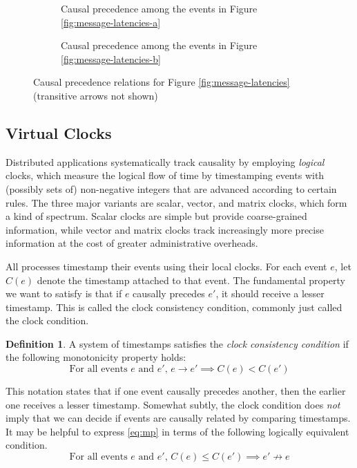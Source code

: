 \documentclass[]             %
{NASA}                       %
\theoremstyle{definition}
\newtheorem{definition}[theorem]{Definition}
\begin{document}
\begin{figure}
  \begingroup
  \setlength\belowcaptionskip{4ex}
  \begin{subfigure}{1\textwidth}
    \centering
    
    \caption{Causal precedence among the events in Figure \ref{fig:message-latencies-a}}
    \label{fig:message-co-a}
  \end{subfigure}
  \endgroup
  \begin{subfigure}{1\textwidth}
    \centering
    
    \caption{Causal precedence among the events in Figure \ref{fig:message-latencies-b}}
    \label{fig:message-co-b}
  \end{subfigure}
  \caption{Causal precedence relations for Figure \ref{fig:message-latencies} (transitive arrows not shown)}
  \label{fig:causal-precedence}
\end{figure}

\subsection{Virtual Clocks}
\label{ssec:timestamps}
Distributed applications systematically track causality by employing
\emph{logical} clocks, which measure the logical flow of time by
timestamping events with (possibly sets of) non-negative integers that
are advanced according to certain rules. The three major variants are
scalar, vector, and matrix clocks, which form a kind of
spectrum. Scalar clocks are simple but provide coarse-grained
information, while vector and matrix clocks track increasingly more
precise information at the cost of greater administrative overheads.

All processes timestamp their events using their local clocks. For
each event $e$, let $C(e)$ denote the timestamp attached to that
event. The fundamental property we want to satisfy is that if $e$
causally precedes $e'$, it should receive a lesser timestamp. This is
called the clock consistency condition, commonly just called the clock condition.

\begin{definition}
  A system of timestamps satisfies the \emph{clock consistency
  condition} if the following monotonicity property holds:
  \[ \textrm{For all events $e$ and $e'$, } e \to e' \implies C(e) < C(e') \label{eq:mp}\tag{CC} \]
\end{definition}

This notation states that if one event causally precedes another, then
the earlier one receives a lesser timestamp. Somewhat subtly, the
clock condition does \emph{not} imply that we can decide if events are
causally related by comparing timestamps. It may be helpful to express
\eqref{eq:mp} in terms of the following logically equivalent
condition.
\[ \textrm{For all events $e$ and $e'$, }C(e) \leq C(e') \implies e'
  \not\to e \label{eq:mp-conv}\tag{CC$'$} \]
\end{document}
